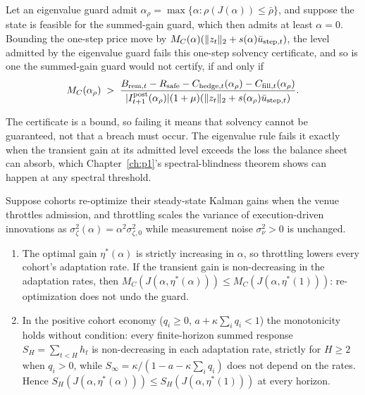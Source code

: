 \begin{proposition}\label{p2:prop:dominance}
Let an eigenvalue guard admit $\alpha_\rho=\max\{\alpha:\rho(J(\alpha))\le\bar\rho\}$, and suppose the state is feasible for the summed-gain guard, which then admits at least $\alpha=0$. Bounding the one-step price move by $M_C(\alpha)(\|z_t\|_2+s(\alpha)\bar u_{{\rm step},t})$, the level admitted by the eigenvalue guard fails this one-step solvency certificate, and so is one the summed-gain guard would not certify, if and only if
\[
M_C(\alpha_\rho)\;>\;\frac{B_{{\rm rem},t}-R_{\rm safe}-C_{{\rm hedge},t}(\alpha_\rho)-C_{{\rm fill},t}(\alpha_\rho)}{|I^{\rm post}_{t+1}(\alpha_\rho)|(1+\mu)(\|z_t\|_2+s(\alpha_\rho)\bar u_{{\rm step},t})} .
\]
\end{proposition}

The certificate is a bound, so failing it means that solvency cannot be guaranteed, not that a breach must occur. The eigenvalue rule fails it exactly when the transient gain at its admitted level exceeds the loss the balance sheet can absorb, which Chapter~\ref{ch:p1}'s spectral-blindness theorem shows can happen at any spectral threshold.

\begin{proposition}\label{p2:prop:lucas}
Suppose cohorts re-optimize their steady-state Kalman gains when the venue throttles admission, and throttling scales the variance of execution-driven innovations as $\sigma_\zeta^2(\alpha)=\alpha^2\sigma_{\zeta,0}^2$ while measurement noise $\sigma_\nu^2>0$ is unchanged.
\begin{enumerate}[label=(\roman*)]
\item The optimal gain $\eta^*(\alpha)$ is strictly increasing in $\alpha$, so throttling lowers every cohort's adaptation rate. If the transient gain is non-decreasing in the adaptation rates, then $M_C(J(\alpha,\eta^*(\alpha)))\le M_C(J(\alpha,\eta^*(1)))$: re-optimization does not undo the guard.
\item In the positive cohort economy ($q_i\ge0$, $a+\kappa\sum_iq_i<1$) the monotonicity holds without condition: every finite-horizon summed response $S_H=\sum_{t<H}h_t$ is non-decreasing in each adaptation rate, strictly for $H\ge2$ when $q_i>0$, while $S_\infty=\kappa/(1-a-\kappa\sum_iq_i)$ does not depend on the rates. Hence $S_H(J(\alpha,\eta^*(\alpha)))\le S_H(J(\alpha,\eta^*(1)))$ at every horizon.
\end{enumerate}
\end{proposition}

